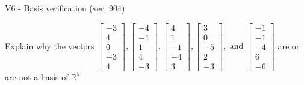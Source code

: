 \begin{exercise}
  \begin{exerciseTitle}V6 - Basis verification (ver. 904)\end{exerciseTitle}
  \begin{exerciseStatement}
    Explain why the vectors \(\left[\begin{array}{r}
-3 \\
4 \\
0 \\
-3 \\
4
\end{array}\right] , \left[\begin{array}{r}
-4 \\
-1 \\
1 \\
4 \\
-3
\end{array}\right] , \left[\begin{array}{r}
4 \\
1 \\
-1 \\
-4 \\
3
\end{array}\right] , \left[\begin{array}{r}
3 \\
0 \\
-5 \\
2 \\
-3
\end{array}\right] , \text{ and } \left[\begin{array}{r}
-1 \\
-1 \\
-4 \\
6 \\
-6
\end{array}\right]\) are or are not a basis of \(\mathbb{R}^5\)	



\end{exerciseStatement}
\end{exercise}
